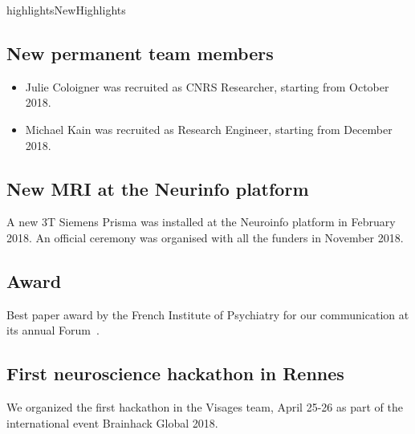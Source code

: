 \documentclass{ra2018}
\begin{document}

\begin{module}{highlights}{NewHighlights}{}

\subsection{New permanent team members}
\begin{itemize}
	\item Julie Coloigner was recruited as CNRS Researcher, starting from October 2018.
	\item Michael Kain was recruited as Research Engineer, starting from December 2018.
\end{itemize}

\subsection{New MRI at the Neurinfo platform}
A new 3T Siemens Prisma was installed at the Neuroinfo platform in February 2018. An official ceremony was organised with all the funders in November 2018.

\subsection{Award}
Best paper award by the French Institute of Psychiatry for our communication at its annual Forum~.

\subsection{First neuroscience hackathon in Rennes}
We organized the first hackathon in the Visages team, April 25-26 as part of the international event Brainhack Global 2018.



\end{module}
\end{document}
